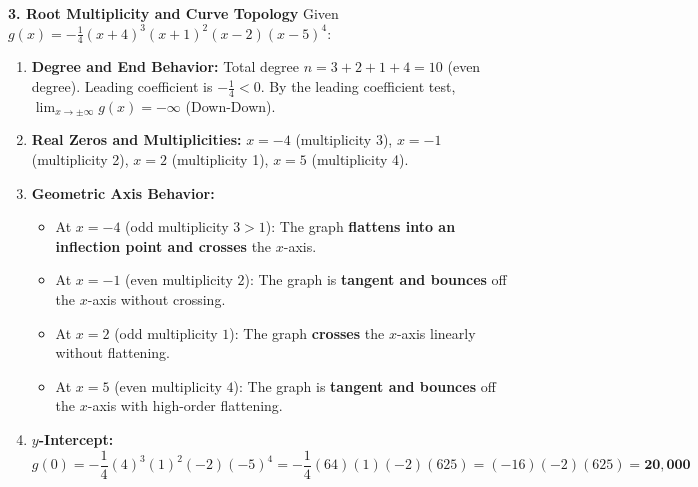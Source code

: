 \textbf{3. Root Multiplicity and Curve Topology}
Given $g(x) = -\frac{1}{4} (x + 4)^3 (x + 1)^2 (x - 2) (x - 5)^4$:
\begin{enumerate}
    \item \textbf{Degree and End Behavior:}
    Total degree $n = 3 + 2 + 1 + 4 = 10$ (even degree). Leading coefficient is $-\frac{1}{4} < 0$.
    By the leading coefficient test, $\lim_{x \to \pm\infty} g(x) = \mathbf{-\infty}$ (Down-Down).
    \item \textbf{Real Zeros and Multiplicities:}
    $x = -4$ (multiplicity 3), $x = -1$ (multiplicity 2), $x = 2$ (multiplicity 1), $x = 5$ (multiplicity 4).
    \item \textbf{Geometric Axis Behavior:}
    \begin{itemize}
        \item At $x = -4$ (odd multiplicity $3 > 1$): The graph \textbf{flattens into an inflection point and crosses} the $x$-axis.
        \item At $x = -1$ (even multiplicity $2$): The graph is \textbf{tangent and bounces} off the $x$-axis without crossing.
        \item At $x = 2$ (odd multiplicity $1$): The graph \textbf{crosses} the $x$-axis linearly without flattening.
        \item At $x = 5$ (even multiplicity $4$): The graph is \textbf{tangent and bounces} off the $x$-axis with high-order flattening.
    \end{itemize}
    \item \textbf{$y$-Intercept:}
    $$g(0) = -\frac{1}{4} (4)^3 (1)^2 (-2) (-5)^4 = -\frac{1}{4}(64)(1)(-2)(625) = (-16)(-2)(625) = \mathbf{20{,}000}$$
\end{enumerate}


